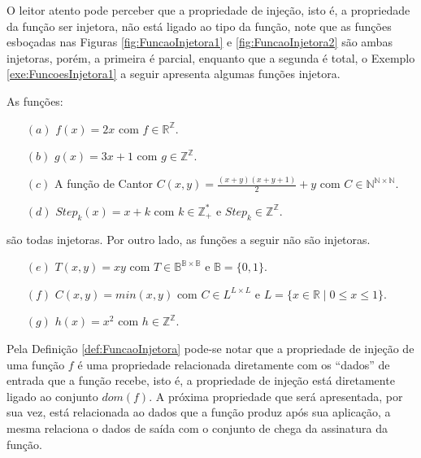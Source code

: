 O leitor atento pode perceber que a propriedade de injeção, isto é, a propriedade da função ser injetora, não está ligado ao tipo da função, note que as funções esboçadas nas Figuras \ref{fig:FuncaoInjetora1} e \ref{fig:FuncaoInjetora2} são ambas injetoras, porém, a primeira é parcial, enquanto que a segunda é total, o Exemplo \ref{exe:FuncoesInjetora1} a seguir apresenta algumas funções injetora.

\begin{exemplo}\label{exe:FuncoesInjetora1}
	As funções:
	\begin{itemize}
		\item[$(a)$] $f(x) = 2x$ com $f \in \mathbb{R}^\mathbb{Z}$.
		\item[$(b)$] $g(x) = 3x + 1$ com $g \in \mathbb{Z}^\mathbb{Z}$.
    \item[$(c)$] A função de Cantor $C(x, y) = \frac{(x + y)(x + y + 1)}{2} + y$ com $C \in \mathbb{N}^{\mathbb{N} \times \mathbb{N}}$.
    \item[$(d)$] $Step_k(x) = x + k$ com $k \in \mathbb{Z}_+^*$ e $Step_k \in \mathbb{Z}^\mathbb{Z}$.
	\end{itemize} 
	são todas injetoras. Por outro lado, as funções a seguir não são injetoras.
	\begin{itemize}
		\item[$(e)$] $T(x, y) = xy$ com $T \in \mathbb{B}^{\mathbb{B} \times \mathbb{B}}$ e $\mathbb{B} = \{0,1\}$.
		\item[$(f)$] $C(x, y) = min(x, y)$ com $C \in L^{L \times L}$ e $L = \{x \in \mathbb{R} \mid 0 \leq x \leq 1\}$.
		\item[$(g)$] $h(x) = x^2$ com $h \in \mathbb{Z}^\mathbb{Z}$.
	\end{itemize} 
\end{exemplo}

Pela Definição \ref{def:FuncaoInjetora} pode-se notar que a propriedade de injeção de uma função $f$ é uma propriedade relacionada diretamente com os ``dados'' de entrada que a função recebe, isto é, a propriedade de injeção está diretamente ligado ao conjunto $dom(f)$. A próxima propriedade que será apresentada, por sua vez, está relacionada ao dados que a função produz após sua aplicação, a mesma relaciona o dados de saída com o conjunto de chega da assinatura da função.


